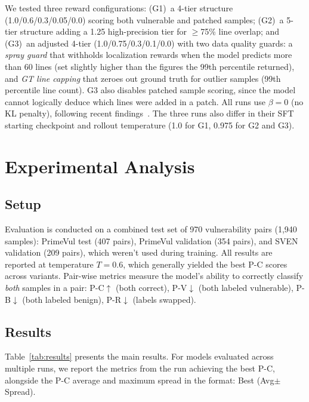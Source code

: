 \documentclass{article}
\begin{document}
We tested three reward configurations: (G1)~a 4-tier structure (1.0/0.6/0.3/0.05/0.0) scoring both vulnerable and patched samples; (G2)~a 5-tier structure adding a 1.25 high-precision tier for $\geq$75\% line overlap; and (G3)~an adjusted 4-tier (1.0/0.75/0.3/0.1/0.0) with two data quality guards: a \textit{spray guard} that withholds localization rewards when the model predicts more than 60 lines (set slightly higher than the figures the 99th percentile returned), and \textit{GT line capping} that zeroes out ground truth for outlier samples (99th percentile line count). G3 also disables patched sample scoring, since the model cannot logically deduce which lines were added in a patch. All runs use $\beta{=}0$ (no KL penalty), following recent findings~\cite{dapo, drgrpo}. The three runs also differ in their SFT starting checkpoint and rollout temperature (1.0 for G1, 0.975 for G2 and G3).

\section{Experimental Analysis}

\subsection{Setup}

Evaluation is conducted on a combined test set of 970 vulnerability pairs (1,940 samples): PrimeVul test (407 pairs), PrimeVul validation (354 pairs), and SVEN validation (209 pairs), which weren't used during training. All results are reported at temperature $T{=}0.6$, which generally yielded the best P-C scores across variants. Pair-wise metrics measure the model's ability to correctly classify \textit{both} samples in a pair: P-C$\uparrow$ (both correct), P-V$\downarrow$ (both labeled vulnerable), P-B$\downarrow$ (both labeled benign), P-R$\downarrow$ (labels swapped).

\subsection{Results}

Table~\ref{tab:results} presents the main results. For models evaluated across multiple runs, we report the metrics from the run achieving the best P-C, alongside the P-C average and maximum spread in the format: Best (Avg$\pm$Spread).
\end{document}

